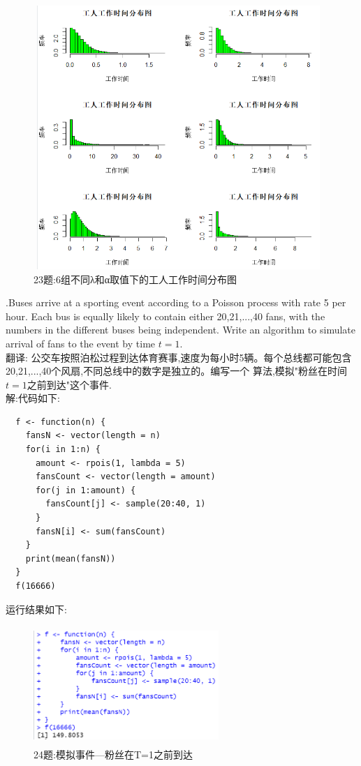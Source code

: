 \documentclass{book}
\begin{document}
\begin{figure}[H]
  \centering
  \includegraphics*[height = 10cm, width = 11cm]{gramFile/第二十三题/6组不同λ和α取值下的工人工作时间分布图.PNG}
  \caption{23题:6组不同λ和α取值下的工人工作时间分布图}
\end{figure}

.Buses arrive at a sporting event according to a Poisson process with rate 5 per hour. Each bus is equally
likely to contain either 20,21,...,40 fans, with the numbers in the different buses being independent.
Write an algorithm to simulate arrival of fans to the event by time $t = 1$.  \\
翻译:
公交车按照泊松过程到达体育赛事,速度为每小时5辆。每个总线都可能包含20,21,...,40个风扇,不同总线中的数字是独立的。编写一个
算法,模拟"粉丝在时间$t=1$之前到达"这个事件. \\
解:代码如下:
\lstset{language = R}
\begin{lstlisting}
  f <- function(n) {
    fansN <- vector(length = n)
    for(i in 1:n) {
      amount <- rpois(1, lambda = 5)
      fansCount <- vector(length = amount)
      for(j in 1:amount) {
        fansCount[j] <- sample(20:40, 1)
      }
      fansN[i] <- sum(fansCount)
    }
    print(mean(fansN))
  }
  f(16666)
\end{lstlisting}
运行结果如下:
\begin{figure}[H]
  \centering
  \includegraphics*[height = 4.5cm, width = 7cm]{gramFile/第二十四题/模拟事件---粉丝在T=1之前到达.PNG}
  \caption{24题:模拟事件---粉丝在T=1之前到达}
\end{figure}
\end{document}
